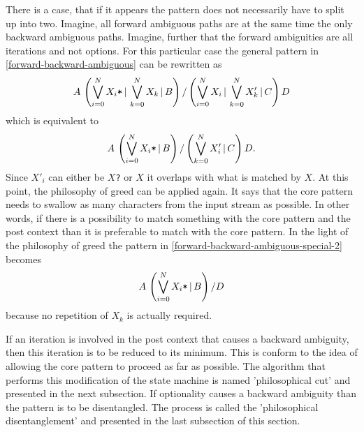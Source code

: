There is a case, that if it appears the pattern does not necessarily have to
split up into two.  Imagine, all forward ambiguous paths are at the same time
the only backward ambiguous paths. Imagine, further that the forward
ambiguities are all iterations and not options. For this particular case the
general pattern in \eqref{forward-backward-ambiguous} can be rewritten as 
\begin{eqnarray} \label{eq:forward-backward-ambiguous-special}
A\,\left (       \bigvee_{i=0}^{N} X_i\mbox{\tt *} 
           \,|\, \bigvee_{k=0}^{N} X_k 
           \,|\, B 
   \right ) / 
   \left (       \bigvee_{i=0}^{N} X_i 
           \,|\, \bigvee_{k=0}^{N} X'_k 
           \,|\, C 
   \right ) D 
\end{eqnarray}
which is equivalent to
\begin{eqnarray} \label{eq:forward-backward-ambiguous-special-2}
A\,\left (       \bigvee_{i=0}^{N} X_i\mbox{\tt *} 
           \,|\, B 
   \right ) / 
   \left (       
           \bigvee_{k=0}^{N} X'_i \,|\, C 
   \right ) D. 
\end{eqnarray}
Since $X'_i$ can either be $X${\tt ?} or $X${\tt *} it overlaps with what is matched
by $X${\tt *}.  At this point, the philosophy of greed can be applied again. It says that
the core pattern needs to swallow as many characters from the input stream
as possible. In other words, if there is a possibility to match something
with the core pattern and the post context than it is preferable to match
with the core pattern. In the light of the philosophy of greed the pattern
in \eqref{forward-backward-ambiguous-special-2} becomes
\begin{eqnarray} \label{eq:forward-backward-ambiguous-special-2}
A\,\left (       \bigvee_{i=0}^{N} X_i\mbox{\tt *} 
           \,|\, B 
   \right ) / D
\end{eqnarray}
because no repetition of $X_k$ is actually required.

If an iteration is involved in the post context that causes a backward
ambiguity, then this iteration is to be reduced to its minimum. This is conform
to the idea of allowing the core pattern to proceed as far as possible. The
algorithm that performs this modification of the state machine is named
'philosophical cut' and presented in the next subsection. If optionality causes
a backward ambiguity than the pattern is to be disentangled. The process is
called the 'philosophical disentanglement' and presented in the last subsection
of this section.


